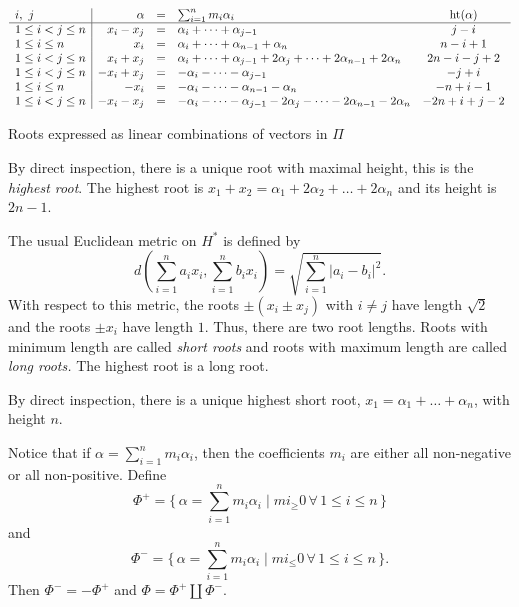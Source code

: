 \begin{table}[h!tb]
  \footnotesize {}
  \renewcommand{\arraystretch}{1.3}
  \begin{equation*}
    \begin{array}{l|rclc}
      i,\ j &\alpha&=&\sum_{i=1}^n m_i\alpha_i&{\operatorname{ht}}(\alpha)\\\hline
      1\leq i< j\leq n&  x_i-x_j& =& \alpha_{i}+ \dots +\alpha_{j-1}& j-i \\
      1\leq i\leq n& x_i&=& \alpha_i+\dots +\alpha_{n-1}+ \alpha_n &
      n-i+1\\ 
      1\leq i< j\leq n& x_i+x_j&=& \alpha_i+ \dots +\alpha_{j-1} + 2\alpha_j+
      \dots +2\alpha_{n-1} +2\alpha_n& 2n-i-j+2 \\ 
      1\leq i< j\leq n& - x_i+x_j& =& -\alpha_{i}- \dots -\alpha_{j-1}& -j+i \\
      1\leq i\leq n& -x_i &= &-\alpha_i-\dots -\alpha_{n-1}- \alpha_n &
      -n+i-1\\ 
      1\leq i< j\leq n&  -x_i-x_j&=& -\alpha_i- \dots -\alpha_{j-1} - 2\alpha_j-
      \dots -2\alpha_{n-1} -2\alpha_n& -2n+i+j-2   
    \end{array}  
  \end{equation*}
  \caption{Roots expressed as linear combinations of vectors in
    $\Pi$}\label{tab:sodplus} 
\end{table}

By direct inspection, there is a unique root with maximal height, this is
the \emph{highest root}. The highest root is
$x_1+x_2=\alpha_1+2\alpha_2+\dots + 2\alpha_n$ and its height is $2n-1$.

The usual Euclidean metric on $H^*$ is defined by 
\[
d(\sum_{i=1}^n a_i x_i, \sum_{i=1}^n b_i x_i) = \sqrt{ \sum_{i=1}^n
  |a_i-b_i|^2}.
\]
With respect to this metric, the roots $\pm (x_i\pm x_j)$ with $i\ne j$ have
length $\sqrt 2$ and the roots $\pm x_i$ have length $1$. Thus, there are
two root lengths. Roots with minimum length are called \emph{short roots}
and roots with maximum length are called \emph{long roots.} The highest root
is a long root.

By direct inspection, there is a unique highest short root,
$x_1=\alpha_1+\dots +\alpha_n$, with height $n$.

Notice that if $\alpha=\sum_{i=1}^n m_i\alpha_i$, then the coefficients
$m_i$ are either all non-negative or all non-positive. Define
\[
\Phi^+=\Big\{\, \alpha=\sum_{i=1}^n m_i\alpha_i\mid mi_\geq 0 \, \forall\,
1\leq i\leq n\,\Big\}
\]
and
\[
\Phi^- = \Big\{\, \alpha=\sum_{i=1}^n m_i\alpha_i\mid mi_\leq 0 \, \forall\,
1\leq i\leq n\,\Big\}.
\]
Then $\Phi^-= -\Phi^+$ and $\Phi = \Phi^+ \coprod \Phi^-$.

